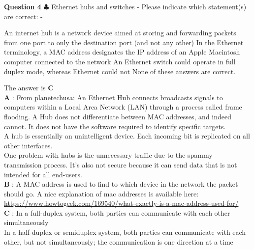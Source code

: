\documentclass[en]{sourcefiles/eplexam}
\newcounter{choice}
\renewcommand\thechoice{\textbf{\Alph{choice}}}
\newcommand\choicelabel{\thechoice$\quad$}
\newenvironment{choices}%
  {\list{\choicelabel}%
     {\usecounter{choice}\def\makelabel##1{\hss\llap{##1}}%
       \settowidth{\leftmargin}{W.\hskip\labelsep\hskip 2.5em}%
       \def\choice{%
         \item
       } %
       \labelwidth\leftmargin\advance\labelwidth-\labelsep
       \topsep=0pt
       \partopsep=0pt
     }%
  }%
  {\endlist}
\begin{document}
\textbf{Question 4} $\clubsuit$ Ethernet hubs and switches - Please indicate which statement(s) are correct:
\begin{choices}
     \choice An internet hub is a network device aimed at storing and forwarding packets from one port to only the destination port (and not any other)
     \choice In the Ethernet terminology, a MAC address designates the IP address of an Apple Macintosh computer connected to the network
     \choice An Ethernet switch could operate in full duplex mode, whereas Ethernet could not
     \choice None of these answers are correct.
\end{choices}
\begin{solution}
    The answer is \textbf{C}\\
    
    
    \noindent \textbf{A} : From planetechusa: An Ethernet Hub connects broadcasts signals to computers within a Local Area Network (LAN) through a process called frame flooding. A Hub does not differentiate between MAC addresses, and indeed cannot. It does not have the software required to identify specific targets.\\
    A hub is essentially an unintelligent device. Each incoming bit is replicated on all other interfaces.\\
    One problem with hubs is the unnecessary traffic due to the spammy transmission process. It’s also not secure because it can send data that is not intended for all end-users.\\
    
    \noindent \textbf{B} : A MAC address is used to find to which device in the network the packet should go.
    A nice explanation of mac addresses is available here:\\ \url{https://www.howtogeek.com/169540/what-exactly-is-a-mac-address-used-for/}\\
    
    
    \noindent \textbf{C} : 
    In a full-duplex system, both parties can communicate with each other simultaneously\\
    In a half-duplex or semiduplex system, both parties can communicate with each other, but not simultaneously; the communication is one direction at a time\\
    
\end{solution}
\end{document}
